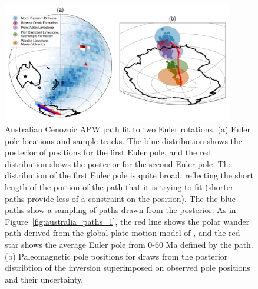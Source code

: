 \documentclass[preprint,12pt,authoryear]{elsarticle}
\begin{document}
\begin{figure}
\includegraphics[width=0.9\textwidth]{figures/australia/australia_paths_2.pdf}
\caption[Australian Cenozoic APW path fit to two Euler rotations.]{Australian Cenozoic APW path fit to two Euler rotations. 
(a) Euler pole locations and sample tracks. The blue distribution shows the posterior of positions for the first Euler pole, and the red distribution shows the posterior for the second Euler pole. The distribution of the first Euler pole is quite broad, reflecting the short length of the portion of the path that it is trying to fit (shorter paths provide less of a constraint on the position). The the blue paths show a sampling of paths drawn from the posterior. As in Figure~\ref{fig:australia_paths_1}, the red line shows the polar wander path derived from the global plate motion model of \citet{seton2012global}, and the red star shows the average Euler pole from 0-60 Ma defined by the \citet{seton2012global} path.
(b) Paleomagnetic pole positions for draws from the posterior distribtion of the inversion superimposed on observed pole positions and their uncertainty.}
\label{fig:australia_paths_2}
\end{figure}
\end{document}
